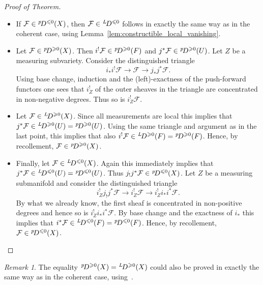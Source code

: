 \documentclass{compositio}
\theoremstyle{plain}
\theoremstyle{definition}
\theoremstyle{remark}
\newtheorem{Rem}[Thm]{Remark}
\newcommand\sheaf{\mathcal}
\newcommand\perv[1][p]{\mkern1mu{}^{#1}\mkern-3mu}
\begin{document}
\begin{proof}[Proof of Theorem]
    \begin{itemize}
        \item 
            If $\sheaf F \in  \perv D^{\leq 0}(X)$, then $\sheaf F \in  \perv[L] D^{\leq 0}$ follows in exactly the same way as in the coherent case, using Lemma~\ref{lem:constructible_local_vanishing}.
        \item 
            Let $\sheaf F \in  \perv D^{\geq 0}(X)$.
            Then $i^! \sheaf F \in  \perv D^{\geq 0}(F)$ and $j^*\sheaf F \in  \perv D^{\geq 0}(U)$.
            Let $Z$ be a measuring subvariety.
            Consider the distinguished triangle 
            \[ 
                i_*i^! \sheaf F \to  \sheaf F \to  j_*j^*\sheaf F.
            \]
            Using base change, induction and the (left)-exactness of the push-forward functors one sees that $i_Z^!$ of the outer sheaves in the triangle are concentrated in non-negative degrees.
            Thus so is $i_Z^! \sheaf F$.
        \item 
            Let $\sheaf F \in  \perv[L] D^{\geq 0}(X)$.
            Since all measurements are local this implies that $j^* \sheaf F \in  \perv[L] D^{\geq 0}(U) = \perv D^{\geq 0}(U)$.
            Using the same triangle and argument as in the last point, this implies that also $i^! \sheaf F \in  \perv[L] D^{\geq 0}(F) = \perv D^{\geq 0}(F)$.
            Hence, by recollement, $\sheaf F \in  \perv D^{\geq 0}(X)$.
        \item 
            Finally, let $\sheaf F \in  \perv[L] D^{\leq 0}(X)$.
            Again this immediately implies that $j^* \sheaf F \in  \perv[L] D^{\leq 0}(U) = \perv D^{\leq 0}(U)$.
            Thus $j_!j^*\sheaf F \in  \perv D^{\leq 0}(X)$.
            Let $Z$ be a measuring submanifold and consider the distinguished triangle
            \[
                i_Z^! j_!j^*\sheaf F \to  i_Z^! \sheaf F \to  i_Z^! i_*i^* \sheaf F.
            \]
            By what we already know, the first sheaf is concentrated in non-positive degrees and hence so is $i_Z^! i_*i^* \sheaf F$.
            By base change and the exactness of $i_*$ this implies that $i^* \sheaf F \in  \perv[L] D^{\leq 0}(F) = \perv D^{\leq 0}(F)$.
            Hence, by recollement, $\sheaf F \in  \perv D^{\leq 0}(X)$.
            \qedhere
    \end{itemize}
\end{proof}

\begin{Rem}
    The equality $\perv D^{\geq 0}(X) = \perv[L]D^{\geq 0}(X)$ could also be proved in exactly the same way as in the coherent case, using~\cite[Exercise~\textsc{x}.10]{KashiwaraSchapira:1994:SheavesOnManifolds}.
\end{Rem}

\printbibliography
\end{document}
